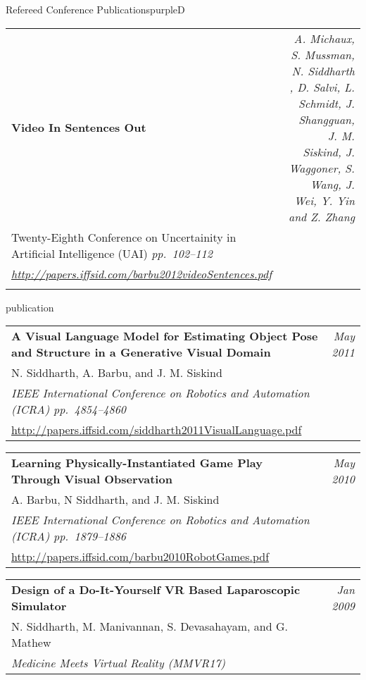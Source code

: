 \documentclass[a4paper]{article}
\makeatletter
\newlength{\itemtextwidth}
\newenvironment{publication}[5]
{ \item
  \begin{tabular*}{\itemtextwidth}{@{}p{5.6in}@{\extracolsep{\fill}}r@{}}
    \textbf{#1} & \textit{#2}\\ #3 &\\ \textit{#4}&\\ #5
  \end{tabular*}
  \vspace*{-2pt}
} {}
\def\item{\addtocounter{enumi}{-2}\oldItem}
\makeatother
\begin{document}
\begin{region}[C][9]{Refereed Conference Publications}{purpleD}
\begin{publication} {Video In Sentences Out}
{      A. Michaux, S. Mussman, N. Siddharth , D. Salvi, L. Schmidt, J. Shangguan,
      J. M. Siskind, J. Waggoner, S. Wang, J. Wei, Y. Yin and Z. Zhang}
    {Twenty-Eighth Conference on Uncertainity in Artificial Intelligence (UAI) \hfill\emph{pp.~102--112}}
    {\url{http://papers.iffsid.com/barbu2012videoSentences.pdf}}
  \end{publication}
  \begin{publication} {A Visual Language Model for Estimating Object
      Pose and Structure in a Generative Visual Domain}
    {May 2011}
    {N. Siddharth, A. Barbu, and J. M. Siskind}
    {IEEE International Conference on Robotics and Automation (ICRA) \hfill \emph{pp.~4854--4860}}
    {\url{http://papers.iffsid.com/siddharth2011VisualLanguage.pdf}}
  \end{publication}
  \begin{publication}{Learning Physically-Instantiated Game Play Through Visual Observation}
    {May 2010}
    {A. Barbu, N Siddharth, and J. M. Siskind}
    {IEEE International Conference on Robotics and Automation (ICRA) \hfill \emph{pp.~1879--1886}}
    {\url{http://papers.iffsid.com/barbu2010RobotGames.pdf}}
  \end{publication}
  \begin{publication} {Design of a Do-It-Yourself VR Based Laparoscopic Simulator}
    {Jan 2009}
    {N. Siddharth, M. Manivannan, S. Devasahayam, and G. Mathew}
    {Medicine Meets Virtual Reality (MMVR17)}
    {} %
  \end{publication}
\end{region}

\end{document}
